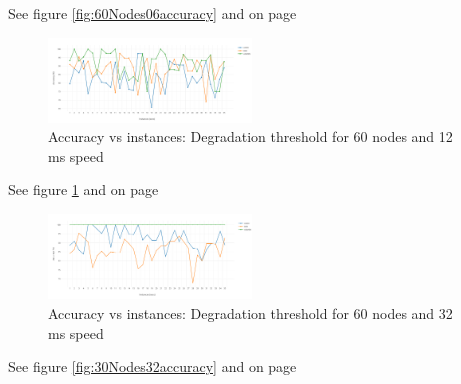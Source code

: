 \documentclass[letterpaper, 10 pt, conference]{ieeeconf}  %
\begin{document}
See figure \ref{fig:60Nodes06accuracy} and on page \pageref{fig:60Nodes06accuracy}





\begin{figure}[H]
\includegraphics[width=0.48\textwidth]{60Nodes12accuracy}
\caption{Accuracy vs instances: Degradation threshold for 60 nodes and 12 ms speed}
\label{fig:60Nodes12accuracy}
\end{figure}

See figure \ref{fig:60Nodes12accuracy} and on page \pageref{fig:30Nodes12accuracy}




\begin{figure}[H]
\includegraphics[width=0.48\textwidth]{60Nodes32accuracy}
\caption{Accuracy vs instances: Degradation threshold for 60 nodes and 32 ms speed}
\label{fig:60Nodes32accuracy}
\end{figure}

See figure \ref{fig:30Nodes32accuracy} and on page \pageref{fig:60Nodes32accuracy}









\end{document}
